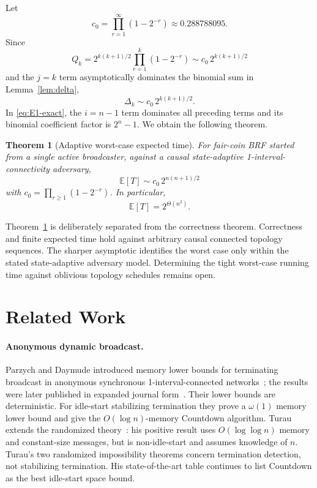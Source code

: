 \documentclass[11pt]{article}
\newtheorem{theorem}{Theorem}
\newcommand{\E}{\mathbb{E}}
\newcommand{\BRF}{\textsc{BRF}}
\begin{document}
Let
\[
  c_0=\prod_{r=1}^{\infty}(1-2^{-r})\approx 0.288788095.
\]
Since
\[
  Q_k
  =2^{k(k+1)/2}\prod_{r=1}^{k}(1-2^{-r})
  \sim c_0\,2^{k(k+1)/2}
\]
and the $j=k$ term asymptotically dominates the binomial sum in Lemma~\ref{lem:delta},
\[
  \Delta_k\sim c_0\,2^{k(k+1)/2}.
\]
In \eqref{eq:E1-exact}, the $i=n-1$ term dominates all preceding terms and its binomial coefficient factor is $2^n-1$. We obtain the following theorem.

\begin{theorem}[Adaptive worst-case expected time]\label{thm:runtime}
For fair-coin \BRF{} started from a single active broadcaster, against a causal state-adaptive 1-interval-connectivity adversary,
\[
  \boxed{
  \E[T]
  \sim c_0\,2^{n(n+1)/2}
  }
\]
with $c_0=\prod_{r\ge1}(1-2^{-r})$. In particular,
\[
  \E[T]=2^{\Theta(n^2)}.
\]
\end{theorem}

Theorem~\ref{thm:runtime} is deliberately separated from the correctness theorem. Correctness and finite expected time hold against arbitrary causal connected topology sequences. The sharper asymptotic identifies the worst case only within the stated state-adaptive adversary model. Determining the tight worst-case running time against oblivious topology schedules remains open.

\section{Related Work}

\paragraph{Anonymous dynamic broadcast.}
Parzych and Daymude introduced memory lower bounds for terminating broadcast in anonymous synchronous 1-interval-connected networks~\cite{ParzychDaymude2024}; the results were later published in expanded journal form~\cite{ParzychDaymude2026}. Their lower bounds are deterministic. For idle-start stabilizing termination they prove a $\omega(1)$ memory lower bound and give the $O(\log n)$-memory Countdown algorithm. Turau extends the randomized theory~\cite{Turau2026}: his positive result uses $O(\log\log n)$ memory and constant-size messages, but is non-idle-start and assumes knowledge of $n$. Turau's two randomized impossibility theorems concern termination detection, not stabilizing termination. His state-of-the-art table continues to list Countdown as the best idle-start space bound.
\end{document}

